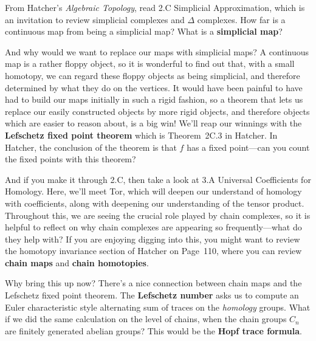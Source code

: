 \documentclass{homework}
\author{Jim Fowler}
\date{Week 3: Simplices}
\begin{document}
\maketitle

From Hatcher's \textit{Algebraic Topology}, read \textsection 2.C
Simplicial Approximation, which is an invitation to review simplicial
complexes and $\Delta$ complexes.  How far is a continuous map from
being a simplicial map?  What is a \textbf{simplicial map}?

And why would we want to replace our maps with simplicial maps?  A
continuous map is a rather floppy object, so it is wonderful to find
out that, with a small homotopy, we can regard these floppy objects as
being simplicial, and therefore determined by what they do on the
vertices.  It would have been painful to have had to build our maps
initially in such a rigid fashion, so a theorem that lets us replace
our easily constructed objects by more rigid objects, and therefore
objects which are easier to reason about, is a big win!  We'll reap
our winnings with the \textbf{Lefschetz fixed point theorem} which is
Theorem~2C.3 in Hatcher.  In Hatcher, the conclusion of the theorem is
that $f$ has a fixed point---can you count the fixed points with this
theorem?

And if you make it through \textsection 2.C, then take a look at 3.A
Universal Coefficients for Homology.  Here, we'll meet Tor, which will
deepen our understand of homology with coefficients, along with
deepening our understanding of the tensor product.  Throughout this,
we are seeing the crucial role played by chain complexes, so it is
helpful to reflect on why chain complexes are appearing so
frequently---what do they help with?  If you are enjoying digging into
this, you might want to review the homotopy invariance section of
Hatcher on Page~110, where you can review \textbf{chain maps} and
\textbf{chain homotopies}.

Why bring this up now?  There's a nice connection between chain maps
and the Lefschetz fixed point theorem.  The \textbf{Lefschetz number}
asks us to compute an Euler characteristic style alternating sum of
traces on the \textit{homology} groups.  What if we did the same
calculation on the level of chains, when the chain groups $C_n$ are
finitely generated abelian groups?  This would be the \textbf{Hopf
trace formula}.
\end{document}
